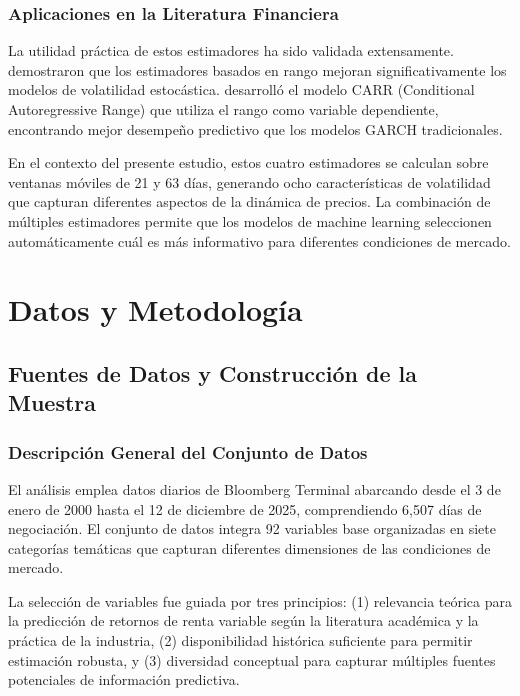 \documentclass[11pt,a4paper]{article}
\begin{document}
\subsubsection{Aplicaciones en la Literatura Financiera}

La utilidad práctica de estos estimadores ha sido validada extensamente. \citet{alizadeh2002} demostraron que los estimadores basados en rango mejoran significativamente los modelos de volatilidad estocástica. \citet{chou2005} desarrolló el modelo CARR (Conditional Autoregressive Range) que utiliza el rango como variable dependiente, encontrando mejor desempeño predictivo que los modelos GARCH tradicionales.

En el contexto del presente estudio, estos cuatro estimadores se calculan sobre ventanas móviles de 21 y 63 días, generando ocho características de volatilidad que capturan diferentes aspectos de la dinámica de precios. La combinación de múltiples estimadores permite que los modelos de machine learning seleccionen automáticamente cuál es más informativo para diferentes condiciones de mercado.

\section{Datos y Metodología}

\subsection{Fuentes de Datos y Construcción de la Muestra}

\subsubsection{Descripción General del Conjunto de Datos}

El análisis emplea datos diarios de Bloomberg Terminal abarcando desde el 3 de enero de 2000 hasta el 12 de diciembre de 2025, comprendiendo 6,507 días de negociación. El conjunto de datos integra 92 variables base organizadas en siete categorías temáticas que capturan diferentes dimensiones de las condiciones de mercado.

La selección de variables fue guiada por tres principios: (1) relevancia teórica para la predicción de retornos de renta variable según la literatura académica y la práctica de la industria, (2) disponibilidad histórica suficiente para permitir estimación robusta, y (3) diversidad conceptual para capturar múltiples fuentes potenciales de información predictiva.
\end{document}
